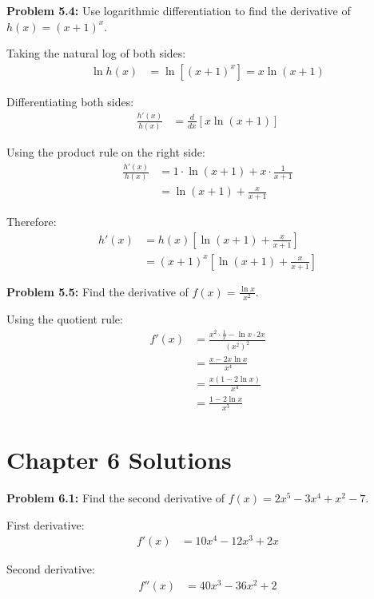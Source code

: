 \documentclass[12pt,a4paper]{book}
\theoremstyle{definition}
\begin{document}
\begin{solution}
\textbf{Problem 5.4:} Use logarithmic differentiation to find the derivative of $h(x) = (x + 1)^x$.

Taking the natural log of both sides:
\begin{align}
\ln h(x) &= \ln[(x + 1)^x] = x \ln(x + 1)
\end{align}

Differentiating both sides:
\begin{align}
\frac{h'(x)}{h(x)} &= \frac{d}{dx}[x \ln(x + 1)]
\end{align}

Using the product rule on the right side:
\begin{align}
\frac{h'(x)}{h(x)} &= 1 \cdot \ln(x + 1) + x \cdot \frac{1}{x + 1}\\
&= \ln(x + 1) + \frac{x}{x + 1}
\end{align}

Therefore:
\begin{align}
h'(x) &= h(x) \left[\ln(x + 1) + \frac{x}{x + 1}\right]\\
&= (x + 1)^x \left[\ln(x + 1) + \frac{x}{x + 1}\right]
\end{align}
\end{solution}

\begin{solution}
\textbf{Problem 5.5:} Find the derivative of $f(x) = \frac{\ln x}{x^2}$.

Using the quotient rule:
\begin{align}
f'(x) &= \frac{x^2 \cdot \frac{1}{x} - \ln x \cdot 2x}{(x^2)^2}\\
&= \frac{x - 2x\ln x}{x^4}\\
&= \frac{x(1 - 2\ln x)}{x^4}\\
&= \frac{1 - 2\ln x}{x^3}
\end{align}
\end{solution}

\section*{Chapter 6 Solutions}

\begin{solution}
\textbf{Problem 6.1:} Find the second derivative of $f(x) = 2x^5 - 3x^4 + x^2 - 7$.

First derivative:
\begin{align}
f'(x) &= 10x^4 - 12x^3 + 2x
\end{align}

Second derivative:
\begin{align}
f''(x) &= 40x^3 - 36x^2 + 2
\end{align}
\end{solution}
\end{document}
